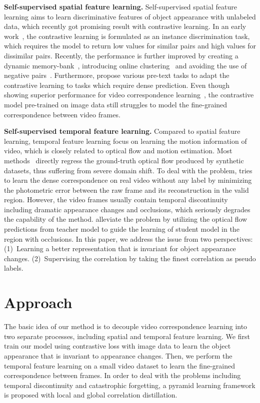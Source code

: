 \documentclass{article}
\begin{document}
\textbf{Self-supervised spatial feature learning.} Self-supervised spatial feature learning aims to learn discriminative features of object appearance with unlabeled data, which recently got promising result with contrastive learning. In an early work~\cite{wu2018unsupervised}, the contrastive learning is formulated as an instance discrimination task, which requires the model to return low values for similar pairs and high values for dissimilar pairs. Recently, the performance is further improved by creating a dynamic memory-bank~\cite{he2020momentum}, introducing online clustering~\cite{caron2020unsupervised} and avoiding the use of negative pairs~\cite{chen2021exploring}\cite{grill2020bootstrap}. Furthermore, \cite{wang2021dense}\cite{xie2021detco}\cite{yang2021instance} propose various pre-text tasks to adapt the contrastive learning to tasks which require dense prediction. Even though showing superior performance for video correspondence learning~\cite{wang2021different}, the contrastive model pre-trained on image data still struggles to model the fine-grained correspondence between video frames. 

\textbf{Self-supervised temporal feature learning. } 
Compared to spatial feature learning, temporal feature learning focus on learning the motion information of video, which is closely related to optical flow and motion estimation. Most methods~\cite{dosovitskiy2015flownet}\cite{teed2020raft} directly regress the ground-truth optical flow produced by synthetic datasets, thus suffering from severe domain shift. To deal with the problem, \cite{meister2018unflow} tries to learn the dense correspondence on real video without any label by minimizing the photometric error between the raw frame and its reconstruction in the valid region. However, the video frames usually contain temporal discontinuity including dramatic appearance changes and occlusions, which seriously degrades the capability of the method. \cite{jonschkowski2020matters}\cite{liu2020learning}\cite{liu2019ddflow} alleviate the problem by utilizing the optical flow predictions from teacher model to guide the learning of student model in the region with occlusions. In this paper, we address the issue from two perspectives: (1)~Learning a better representation that is invariant for object appearance changes. (2)~Supervising the correlation by taking the finest correlation as pseudo labels.


\section{Approach}
The basic idea of our method is to decouple video correspondence learning into two separate processes, including spatial and temporal feature learning. We first train our model using contrastive loss with image data to learn the object appearance that is invariant to appearance changes. Then, we perform the temporal feature learning on a small video dataset to learn the fine-grained correspondence between frames. In order to deal with the problems including temporal discontinuity and catastrophic forgetting, a pyramid learning framework is proposed with local and global correlation distillation.
\end{document}
